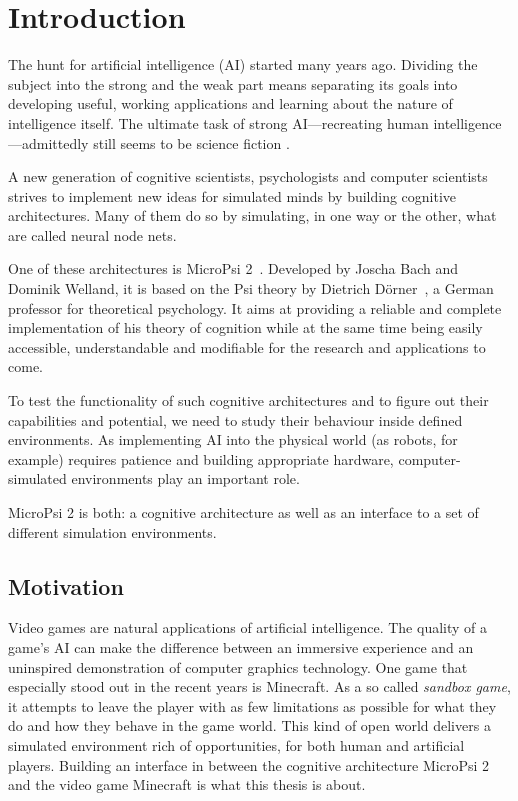 \chapter{Introduction}
\label{chap:1}


The hunt for artificial intelligence (AI) started many years ago. Dividing the subject into the strong and the weak part means separating its goals into developing useful, working applications and learning about the nature of intelligence itself. The ultimate task of strong AI---recreating human intelligence---admittedly still seems to be science fiction    .


A new generation of cognitive scientists, psychologists and computer scientists strives to implement new ideas for simulated minds by building cognitive architectures. Many of them do so by simulating, in one way or the other, what are called neural node nets.

One of these architectures is MicroPsi 2~\cite{conf/agi/Bach12}. Developed by Joscha Bach and Dominik Welland, it is based on the Psi theory by Dietrich Dörner~\cite{Doerner98}, a German professor for theoretical psychology. It aims at providing a reliable and complete implementation of his theory of cognition while at the same time being easily accessible, understandable and modifiable for the research and applications to come.

To test the functionality of such cognitive architectures and to figure out their capabilities and potential, we need to study their behaviour inside defined environments. As implementing AI into the physical world (as robots, for example) requires patience and building appropriate hardware, computer-simulated environments play an important role.

MicroPsi 2 is both: a cognitive architecture as well as an interface to a set of different simulation environments.

\section{Motivation}


Video games are natural applications of artificial intelligence. The quality of a game's AI can make the difference between an immersive experience and an uninspired demonstration of computer graphics technology. One game that especially stood out in the recent years is Minecraft. As a so called \emph{sandbox game}, it attempts to leave the player with as few limitations as possible for what they do and how they behave in the game world. This kind of open world delivers a simulated environment rich of opportunities, for both human and artificial players. Building an interface in between the cognitive architecture MicroPsi 2 and the video game Minecraft is what this thesis is about.

